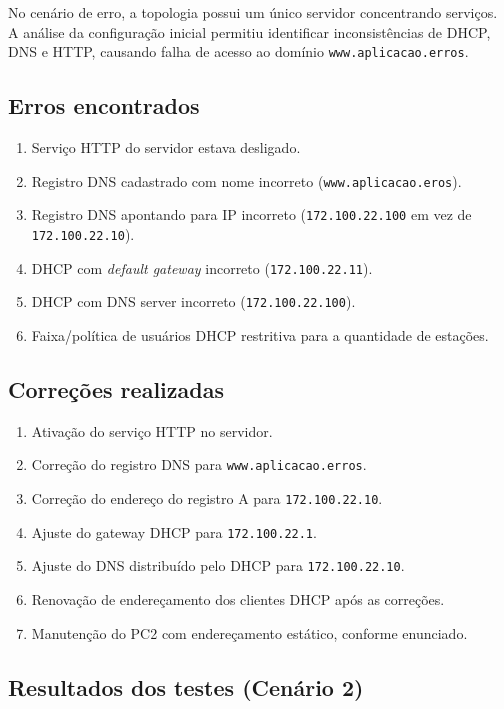 \documentclass[12pt,a4paper]{article}
\begin{document}
No cenário de erro, a topologia possui um único servidor concentrando serviços. A análise da configuração inicial permitiu identificar inconsistências de DHCP, DNS e HTTP, causando falha de acesso ao domínio \texttt{www.aplicacao.erros}.

\subsection*{Erros encontrados}
\begin{enumerate}
\item Serviço HTTP do servidor estava desligado.
\item Registro DNS cadastrado com nome incorreto (\texttt{www.aplicacao.eros}).
\item Registro DNS apontando para IP incorreto (\texttt{172.100.22.100} em vez de \texttt{172.100.22.10}).
\item DHCP com \textit{default gateway} incorreto (\texttt{172.100.22.11}).
\item DHCP com DNS server incorreto (\texttt{172.100.22.100}).
\item Faixa/política de usuários DHCP restritiva para a quantidade de estações.
\end{enumerate}

\subsection*{Correções realizadas}
\begin{enumerate}
\item Ativação do serviço HTTP no servidor.
\item Correção do registro DNS para \texttt{www.aplicacao.erros}.
\item Correção do endereço do registro A para \texttt{172.100.22.10}.
\item Ajuste do gateway DHCP para \texttt{172.100.22.1}.
\item Ajuste do DNS distribuído pelo DHCP para \texttt{172.100.22.10}.
\item Renovação de endereçamento dos clientes DHCP após as correções.
\item Manutenção do PC2 com endereçamento estático, conforme enunciado.
\end{enumerate}

\subsection*{Resultados dos testes (Cenário 2)}
\end{document}
